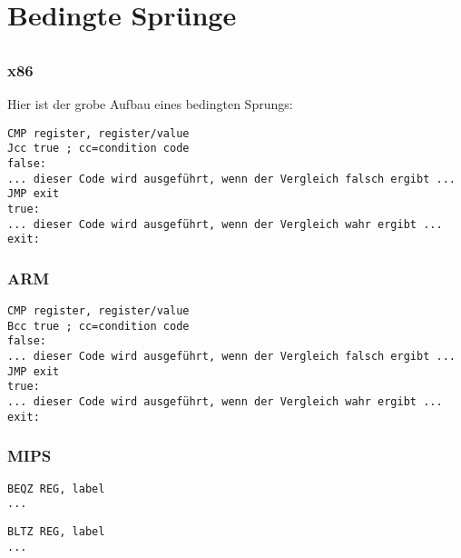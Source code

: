 \section{Bedingte Sprünge}
\label{sec:Jcc}






\subsection{\Conclusion{}}

\subsubsection{x86}

Hier ist der grobe Aufbau eines bedingten Sprungs:

\begin{lstlisting}[caption=x86,style=customasmx86]
CMP register, register/value
Jcc true ; cc=condition code
false:
... dieser Code wird ausgeführt, wenn der Vergleich falsch ergibt ...
JMP exit 
true:
... dieser Code wird ausgeführt, wenn der Vergleich wahr ergibt ...
exit:
\end{lstlisting}

\subsubsection{ARM}

\begin{lstlisting}[caption=ARM,style=customasmARM]
CMP register, register/value
Bcc true ; cc=condition code
false:
... dieser Code wird ausgeführt, wenn der Vergleich falsch ergibt ...
JMP exit 
true:
... dieser Code wird ausgeführt, wenn der Vergleich wahr ergibt ...
exit:
\end{lstlisting}

\subsubsection{MIPS}

\begin{lstlisting}[caption=prüfe auf Null,style=customasmMIPS]
BEQZ REG, label
...
\end{lstlisting}

\begin{lstlisting}[caption=Prüfe auf kleiner Null,style=customasmMIPS]
BLTZ REG, label
...
\end{lstlisting}

